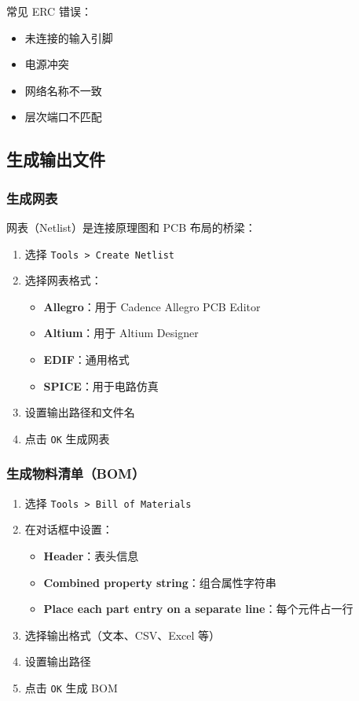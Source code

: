 常见 ERC 错误：

\begin{itemize}
  \item 未连接的输入引脚
  \item 电源冲突
  \item 网络名称不一致
  \item 层次端口不匹配
\end{itemize}

\subsection{生成输出文件}

\subsubsection{生成网表}

网表（Netlist）是连接原理图和 PCB 布局的桥梁：


\begin{enumerate}
  \item 选择 \lstinline{Tools > Create Netlist}
  \item 选择网表格式：
    \begin{itemize}
      \item \textbf{Allegro}：用于 Cadence Allegro PCB Editor
      \item \textbf{Altium}：用于 Altium Designer
      \item \textbf{EDIF}：通用格式
      \item \textbf{SPICE}：用于电路仿真
    \end{itemize}
  \item 设置输出路径和文件名
  \item 点击 \lstinline{OK} 生成网表
\end{enumerate}

\subsubsection{生成物料清单（BOM）}


\begin{enumerate}
  \item 选择 \lstinline{Tools > Bill of Materials}
  \item 在对话框中设置：
    \begin{itemize}
      \item \textbf{Header}：表头信息
      \item \textbf{Combined property string}：组合属性字符串
      \item \textbf{Place each part entry on a separate line}：每个元件占一行
    \end{itemize}
  \item 选择输出格式（文本、CSV、Excel 等）
  \item 设置输出路径
  \item 点击 \lstinline{OK} 生成 BOM
\end{enumerate}

